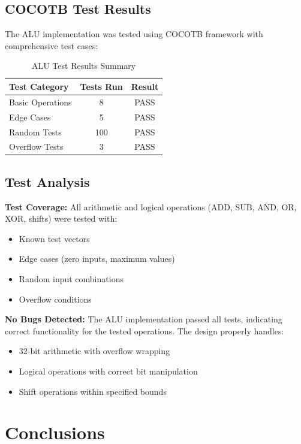 \documentclass[11pt]{article}
\begin{document}
\subsection{COCOTB Test Results}

The ALU implementation was tested using COCOTB framework with comprehensive test cases:

\begin{table}[h]
\centering
\caption{ALU Test Results Summary}
\label{tab:alu_results}
\begin{tabular}{@{}lcc@{}}
\toprule
Test Category & Tests Run & Result \\
\midrule
Basic Operations & 8 & PASS \\
Edge Cases & 5 & PASS \\
Random Tests & 100 & PASS \\
Overflow Tests & 3 & PASS \\
\bottomrule
\end{tabular}
\end{table}

\subsection{Test Analysis}

\textbf{Test Coverage:} All arithmetic and logical operations (ADD, SUB, AND, OR, XOR, shifts) were tested with:
\begin{itemize}
    \item Known test vectors
    \item Edge cases (zero inputs, maximum values)
    \item Random input combinations
    \item Overflow conditions
\end{itemize}

\textbf{No Bugs Detected:} The ALU implementation passed all tests, indicating correct functionality for the tested operations. The design properly handles:
\begin{itemize}
    \item 32-bit arithmetic with overflow wrapping
    \item Logical operations with correct bit manipulation
    \item Shift operations within specified bounds
\end{itemize}

\section{Conclusions}
\end{document}
